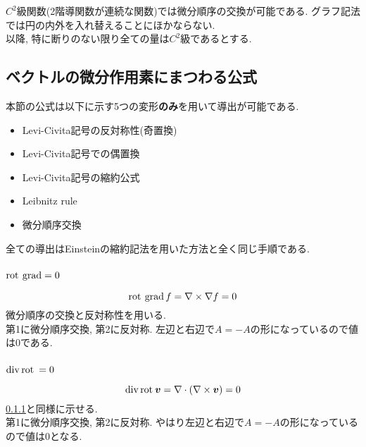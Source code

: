 \documentclass[dvipdfmx]{jsarticle}
\begin{document}
$C^2$級関数(2階導関数が連続な関数)では微分順序の交換が可能である.
グラフ記法では円の内外を入れ替えることにほかならない.
\begin{equation*}
    
\end{equation*}
以降, 特に断りのない限り全ての量は$C^2$級であるとする.



\subsection{ベクトルの微分作用素にまつわる公式}

本節の公式は以下に示す5つの変形\textbf{のみ}を用いて導出が可能である.
\begin{itemize}
    \item Levi-Civita記号の反対称性(奇置換)
    \item Levi-Civita記号での偶置換
    \item Levi-Civita記号の縮約公式
    \item Leibnitz rule
    \item 微分順序交換
\end{itemize}
全ての導出はEinsteinの縮約記法を用いた方法と全く同じ手順である.


\subsubsection{$\mathrm{rot}\:\operatorname{\mathrm{grad}}=0$}
\label{sec: rot grad}

\begin{equation*}
    \mathrm{rot}\:\operatorname{\mathrm{grad}} f=\nabla\times\nabla f=0
\end{equation*}
微分順序の交換と反対称性を用いる.
\begin{equation*}
    
\end{equation*}
第1に微分順序交換, 第2に反対称.
左辺と右辺で$A=-A$の形になっているので値は$0$である.


\subsubsection{$\operatorname{\mathrm{div}}\mathrm{rot}\:=0$}

\begin{equation*}
    \operatorname{\mathrm{div}}\mathrm{rot}\:\bm{v}=\nabla\cdot(\nabla\times\bm{v})=0
\end{equation*}
\ref{sec: rot grad}と同様に示せる.
\begin{equation*}
    
\end{equation*}
第1に微分順序交換, 第2に反対称.
やはり左辺と右辺で$A=-A$の形になっているので値は$0$となる.
\end{document}
